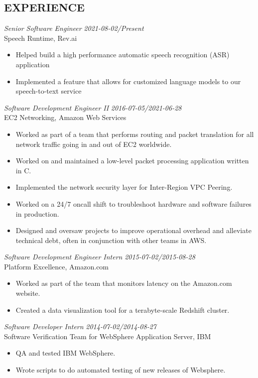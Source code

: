 \documentclass[overlapped, 10pt]{res} %
\begin{document}
\begin{resume}
 
\section{EXPERIENCE}

{\sl Senior Software Engineer} \hfill {\sl 2021-08-02/Present} \\
Speech Runtime, Rev.ai
\begin{itemize} \itemsep -2pt %
    \item Helped build a high performance automatic speech recognition (ASR) application
    \item Implemented a feature that allows for customized language models to our speech-to-text service
\end{itemize}
{\sl Software Development Engineer II} \hfill {\sl 2016-07-05/2021-06-28} \\
EC2 Networking, Amazon Web Services
\begin{itemize} \itemsep -2pt %
    \item Worked as part of a team that performs routing and packet translation for all network traffic going in and out of EC2 worldwide.
    \item Worked on and maintained a low-level packet processing application written in C.
    \item Implemented the network security layer for Inter-Region VPC Peering.
    \item Worked on a 24/7 oncall shift to troubleshoot hardware and software failures in production.
    \item Designed and oversaw projects to improve operational overhead and alleviate technical debt, often in conjunction with other teams in AWS.
\end{itemize}
{\sl Software Development Engineer Intern} \hfill {\sl 2015-07-02/2015-08-28} \\
Platform Excellence, Amazon.com
\begin{itemize} \itemsep -2pt %
    \item Worked as part of the team that monitors latency on the Amazon.com website.
    \item Created a data visualization tool for a terabyte-scale Redshift cluster.
\end{itemize}
{\sl Software Developer Intern} \hfill {\sl 2014-07-02/2014-08-27} \\
Software Verification Team for WebSphere Application Server, IBM
\begin{itemize} \itemsep -2pt %
    \item QA and tested IBM WebSphere.
    \item Wrote scripts to do automated testing of new releases of Websphere.
\end{itemize}
 


\end{resume}
\end{document}
